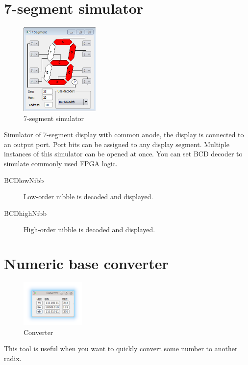\section{7-segment simulator}
    \begin{figure}
        \centering
        \includegraphics[width=110pt]{img/7seg_sim.png}
        \caption{7-segment simulator}
    \end{figure}
    Simulator of 7-segment display with common anode, the display is connected to an output port. Port bits can be
    assigned to any display segment. Multiple instances of this simulator can be opened at once. You can set BCD decoder
    to simulate commonly used FPGA logic.

    \begin{description}
        \item[BCDlowNibb] Low-order nibble is decoded and displayed.
        \item[BCDhighNibb] High-order nibble is decoded and displayed.
    \end{description}

\section{Numeric base converter}
    \begin{figure}
            \centering
            \includegraphics[width=90pt]{img/converter.png}
            \caption{Converter}
    \end{figure}
    This tool is useful when you want to quickly convert some number to another radix.
